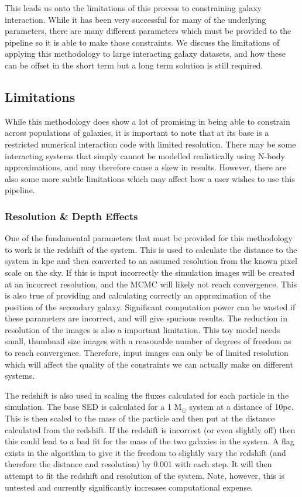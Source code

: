 This leads us onto the limitations of this process to constraining galaxy interaction. While it has been very successful for many of the underlying parameters, there are many different parameters which must be provided to the pipeline so it is able to make those constraints. We discuss the limitations of applying this methodology to large interacting galaxy datasets, and how these can be offset in the short term but a long term solution is still required.

\subsection{Limitations}\label{limitations}
\noindent While this methodology does show a lot of promising in being able to constrain across populations of galaxies, it is important to note that at its base is a restricted numerical interaction code with limited resolution. There may be some interacting systems that simply cannot be modelled realistically using N-body approximations, and may therefore cause a skew in results. However, there are also some more subtle limitations which may affect how a user wishes to use this pipeline.

\subsubsection{Resolution \& Depth Effects}\label{resolution_effect}
\noindent One of the fundamental parameters that must be provided for this methodology to work is the redshift of the system. This is used to calculate the distance to the system in kpc and then converted to an assumed resolution from the known pixel scale on the sky. If this is input incorrectly the simulation images will be created at an incorrect resolution, and the MCMC will likely not reach convergence. This is also true of providing and calculating correctly an approximation of the position of the secondary galaxy. Significant computation power can be wasted if these parameters are incorrect, and will give spurious results. The reduction in resolution of the images is also a important limitation. This toy model needs small, thumbnail size images with a reasonable number of degrees of freedom as to reach convergence. Therefore, input images can only be of limited resolution which will affect the quality of the constraints we can actually make on different systems. 

The redshift is also used in scaling the fluxes calculated for each particle in the simulation. The base SED is calculated for a 1 M$_\odot$ system at a distance of 10pc. This is then scaled to the mass of the particle and then put at the distance calculated from the redshift. If the redshift is incorrect (or even slightly off) then this could lead to a bad fit for the mass of the two galaxies in the system. A flag exists in the algorithm to give it the freedom to slightly vary the redshift (and therefore the distance and resolution) by 0.001 with each step. It will then attempt to fit the redshift and resolution of the system. Note, however, this is untested and currently significantly increases computational expense.

